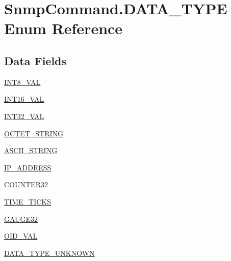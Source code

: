 \hypertarget{enummib2bib_1_1_snmp_command_1_1_d_a_t_a___t_y_p_e}{}\section{Snmp\+Command.\+D\+A\+T\+A\+\_\+\+T\+Y\+P\+E Enum Reference}
\label{enummib2bib_1_1_snmp_command_1_1_d_a_t_a___t_y_p_e}
\subsection*{Data Fields}
\begin{DoxyCompactItemize}
\item 
\hyperlink{enummib2bib_1_1_snmp_command_1_1_d_a_t_a___t_y_p_e_a403280f73f6e5970685000c40b07a769}{I\+N\+T8\+\_\+\+V\+A\+L}
\item 
\hyperlink{enummib2bib_1_1_snmp_command_1_1_d_a_t_a___t_y_p_e_aa32733bc77d64c5f1477b702e33cd839}{I\+N\+T16\+\_\+\+V\+A\+L}
\item 
\hyperlink{enummib2bib_1_1_snmp_command_1_1_d_a_t_a___t_y_p_e_aae57621f2b26168c002909c9cbd3b9be}{I\+N\+T32\+\_\+\+V\+A\+L}
\item 
\hyperlink{enummib2bib_1_1_snmp_command_1_1_d_a_t_a___t_y_p_e_a8fbd772a1cb7bca709fc66b8dba63884}{O\+C\+T\+E\+T\+\_\+\+S\+T\+R\+I\+N\+G}
\item 
\hyperlink{enummib2bib_1_1_snmp_command_1_1_d_a_t_a___t_y_p_e_ae314fdec934331207f3c56291ce94b1d}{A\+S\+C\+I\+I\+\_\+\+S\+T\+R\+I\+N\+G}
\item 
\hyperlink{enummib2bib_1_1_snmp_command_1_1_d_a_t_a___t_y_p_e_ad41299d8d8aa12812ae2206f534b195b}{I\+P\+\_\+\+A\+D\+D\+R\+E\+S\+S}
\item 
\hyperlink{enummib2bib_1_1_snmp_command_1_1_d_a_t_a___t_y_p_e_a3e0e7f3d4f8cf60e5192e9a22ae2f8bc}{C\+O\+U\+N\+T\+E\+R32}
\item 
\hyperlink{enummib2bib_1_1_snmp_command_1_1_d_a_t_a___t_y_p_e_a6f02077b55b986d19b9a032458258590}{T\+I\+M\+E\+\_\+\+T\+I\+C\+K\+S}
\item 
\hyperlink{enummib2bib_1_1_snmp_command_1_1_d_a_t_a___t_y_p_e_ab868491bfa217195113453910a412016}{G\+A\+U\+G\+E32}
\item 
\hyperlink{enummib2bib_1_1_snmp_command_1_1_d_a_t_a___t_y_p_e_ada6c6a6988a58987691874ebf2f9daa7}{O\+I\+D\+\_\+\+V\+A\+L}
\item 
\hyperlink{enummib2bib_1_1_snmp_command_1_1_d_a_t_a___t_y_p_e_a913677eacba232e9a9460d98f62cb5d0}{D\+A\+T\+A\+\_\+\+T\+Y\+P\+E\+\_\+\+U\+N\+K\+N\+O\+W\+N}
\end{DoxyCompactItemize}



